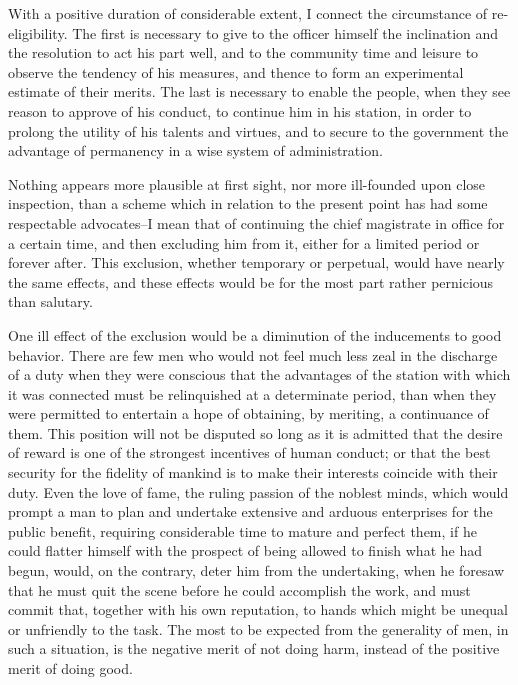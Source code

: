 With a positive duration of considerable extent, I connect the circumstance of re-eligibility. The first is necessary to give to the officer himself the inclination and the resolution to act his part well, and to the community time and leisure to observe the tendency of his measures, and thence to form an experimental estimate of their merits. The last is necessary to enable the people, when they see reason to approve of his conduct, to continue him in his station, in order to prolong the utility of his talents and virtues, and to secure to the government the advantage of permanency in a wise system of administration.

Nothing appears more plausible at first sight, nor more ill-founded upon close inspection, than a scheme which in relation to the present point has had some respectable advocates--I mean that of continuing the chief magistrate in office for a certain time, and then excluding him from it, either for a limited period or forever after. This exclusion, whether temporary or perpetual, would have nearly the same effects, and these effects would be for the most part rather pernicious than salutary.

One ill effect of the exclusion would be a diminution of the inducements to good behavior. There are few men who would not feel much less zeal in the discharge of a duty when they were conscious that the advantages of the station with which it was connected must be relinquished at a determinate period, than when they were permitted to entertain a hope of obtaining, by meriting, a continuance of them. This position will not be disputed so long as it is admitted that the desire of reward is one of the strongest incentives of human conduct; or that the best security for the fidelity of mankind is to make their interests coincide with their duty. Even the love of fame, the ruling passion of the noblest minds, which would prompt a man to plan and undertake extensive and arduous enterprises for the public benefit, requiring considerable time to mature and perfect them, if he could flatter himself with the prospect of being allowed to finish what he had begun, would, on the contrary, deter him from the undertaking, when he foresaw that he must quit the scene before he could accomplish the work, and must commit that, together with his own reputation, to hands which might be unequal or unfriendly to the task. The most to be expected from the generality of men, in such a situation, is the negative merit of not doing harm, instead of the positive merit of doing good.

